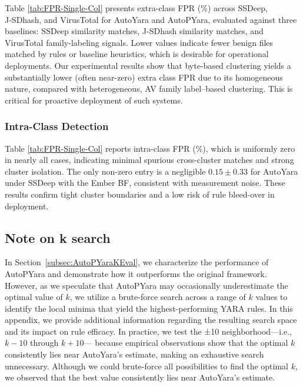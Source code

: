 \noindent Table \ref{tab:FPR-Single-Col} presents extra-class FPR (\%) across SSDeep, J‑SDhash, and VirusTotal for AutoYara and AutoPYara, evaluated against three baselines: SSDeep similarity matches, J‑SDhash similarity matches, and VirusTotal family-labeling signals. Lower values indicate fewer benign files matched by rules or baseline heuristics, which is desirable for operational deployments. Our experimental results show that byte-based clustering yields a substantially lower (often near-zero) extra class FPR due to its homogeneous nature, compared with heterogeneous, AV family label–based clustering. This is critical for proactive deployment of such systems.


\subsubsection{Intra-Class Detection}

 Table \ref{tab:FPR-Single-Col} reports intra-class FPR (\%), which is uniformly zero in nearly all cases, indicating minimal spurious cross-cluster matches and strong cluster isolation. The only non-zero entry is a negligible \(0.15 \pm 0.33\) for AutoYara under SSDeep with the Ember BF, consistent with measurement noise. These results confirm tight cluster boundaries and a low risk of rule bleed-over in deployment.



\subsection{Note on {k} search}
\label{app:note}

\noindent In Section~\ref{subsec:AutoPYaraKEval}, we characterize the performance of AutoPYara and demonstrate how it outperforms the original framework. However, as we speculate that AutoPYara may occasionally underestimate the optimal value of $k$, we utilize a brute-force search across a range of $k$ values to identify the local minima that yield the highest-performing YARA rules. In this appendix, we provide additional information regarding the resulting search space and its impact on rule efficacy.  In practice, we test the ±10 neighborhood—i.e., $k-10$ through  $k+10$— because empirical observations show that the optimal $k$ consistently lies near AutoYara’s estimate, making an exhaustive search unnecessary. Although we could brute-force all possibilities to find the optimal $k$, we observed that the best value consistently lies near AutoYara’s estimate.




